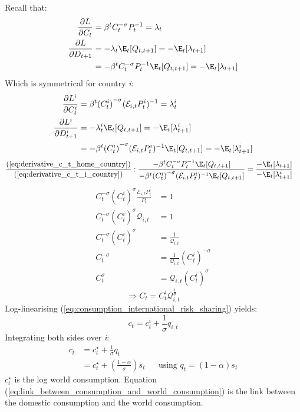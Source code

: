 Recall that:
\begin{align}
    \frac{\partial L}{\partial C_t} &= \beta^t C_t^{-\sigma} P_{t}^{-1} = \lambda_t \nonumber\\
    \frac{\partial L}{\partial D_{t+1}} & = -\lambda_t \E_t[Q_{t,t+1}] = -\E_t[\lambda_{t+1}] \nonumber\\
    &=-\beta^t C_t^{-\sigma} P_{t}^{-1} \E_t[Q_{t,t+1}] = -\E_t[\lambda_{t+1}] \label{eq:derivative_c_t_home_country}
\end{align}
Which is symmetrical for country \textit{i}:
\begin{align}
    \frac{\partial L^i}{\partial C_t^i} &= \beta^t {(C^i_t)}^{-\sigma} (\mathcal{E}_{i,t}P^i_{t})^{-1} = \lambda^i_t \nonumber\\
    \frac{\partial L^i}{\partial D_{t+1}^i} & = -\lambda^i_t \E_t[Q_{t,t+1}] = -\E_t[\lambda^i_{t+1}] \nonumber\\
    &=-\beta^t {(C^i_t)}^{-\sigma} (\mathcal{E}_{i,t}P^i_{t})^{-1} \E_t[Q_{t,t+1}] = -\E_t[\lambda^i_{t+1}] \label{eq:derivative_c_t_i_country}
\end{align}
\begin{align*}
    \frac{\text{(\ref{eq:derivative_c_t_home_country})}}{\text{(\ref{eq:derivative_c_t_i_country})}}: \frac{-\beta^t C_t^{-\sigma} P_{t}^{-1} \E_t[Q_{t,t+1}]}{-\beta^t {(C^i_t)}^{-\sigma} (\mathcal{E}_{i,t}P^i_{t})^{-1} \E_t[Q_{t,t+1}]} &= \frac{-\E_t[\lambda_{t+1}]}{-\E_t[\lambda^i_{t+1}]}
\end{align*} 
\begin{align*}   
    C_t^{-\sigma}{(C^i_t)}^{\sigma} \frac{\mathcal{E}_{i,t}P^i_{t}}{P_t} &= 1 \\
    C_t^{-\sigma}{(C^i_t)}^{\sigma} \mathcal{Q}_{i,t} &= 1 \\
    C_t^{-\sigma}{(C^i_t)}^{\sigma}  &= \frac{1}{\mathcal{Q}_{i,t}} \\
    C_t^{-\sigma}  &= \frac{1}{\mathcal{Q}_{i,t}}{(C^i_t)}^{-\sigma} \\
    C_t^{\sigma}  &= \mathcal{Q}_{i,t}{(C^i_t)}^{\sigma}
\end{align*}
\begin{equation}\label{eq:consumption_international_risk_sharing}
    \Rightarrow C_t  = {C^i_t}\mathcal{Q}_{i,t}^{\frac{1}{\sigma}}
\end{equation}
Log-linearising (\ref{eq:consumption_international_risk_sharing}) yields:
\begin{equation}
    c_t = c_{t}^i + \frac{1}{\sigma}q_{i,t}
\end{equation}
Integrating both sides over \textit{i}:
\begin{align}
    c_t & = c_t^{\star} + \frac{1}{\sigma}q_t                                                                               &  &                                  \\
        & = c_t^{\star} + \left(\frac{1-\alpha}{\sigma}\right)s_t \label{eq:link_between_consumption_and_world_consumption} &  & \text{using $q_t=(1-\alpha)s_t$}
\end{align}
$c_t^{\star}$ is the log world consumption. Equation (\ref{eq:link_between_consumption_and_world_consumption}) is the link between the domestic consumption and the world consumption.
